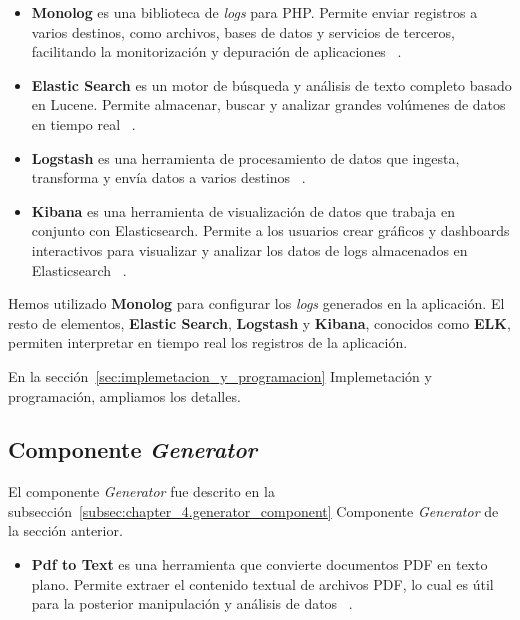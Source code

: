 \begin{itemize}
    \item \textbf{Monolog} es una biblioteca de \textit{logs} para PHP. Permite enviar registros a varios destinos, como
    archivos, bases de datos y servicios de terceros, facilitando la monitorización y depuración de aplicaciones
    ~\cite{https://github.com/Seldaek/monolog}.
    \item \textbf{Elastic Search} es un motor de búsqueda y análisis de texto completo basado en Lucene.
    Permite almacenar, buscar y analizar grandes volúmenes de datos en tiempo real
    ~\cite{https://www.elastic.co/guide/en/elasticsearch/reference/current/index.html}.
    \item \textbf{Logstash} es una herramienta de procesamiento de datos que ingesta, transforma y envía datos a varios
    destinos ~\cite{https://www.elastic.co/guide/en/logstash/current/index.html}.
    \item \textbf{Kibana} es una herramienta de visualización de datos que trabaja en conjunto con Elasticsearch.
    Permite a los usuarios crear gráficos y dashboards interactivos para visualizar y analizar los datos de logs
    almacenados en Elasticsearch ~\cite{https://www.elastic.co/guide/en/kibana/current/index.html}.
\end{itemize}

Hemos utilizado \textbf{Monolog} para configurar los \textit{logs} generados en la aplicación.
El resto de elementos, \textbf{Elastic Search}, \textbf{Logstash} y \textbf{Kibana}, conocidos como \textbf{ELK},
permiten interpretar en tiempo real los registros de la aplicación.

En la sección~\ref{sec:implemetacion_y_programacion} Implemetación y programación, ampliamos los detalles.

\subsection*{Componente \textit{Generator}}

El componente \textit{Generator} fue descrito en la subsección~\ref{subsec:chapter_4.generator_component} Componente
\textit{Generator} de la sección anterior.

\begin{itemize}
    \item \textbf{Pdf to Text} es una herramienta que convierte documentos PDF en texto plano.
    Permite extraer el contenido textual de archivos PDF, lo cual es útil para la posterior manipulación y análisis de
    datos ~\cite{https://www.xpdfreader.com/pdftotext-man.html}.
\end{itemize}

